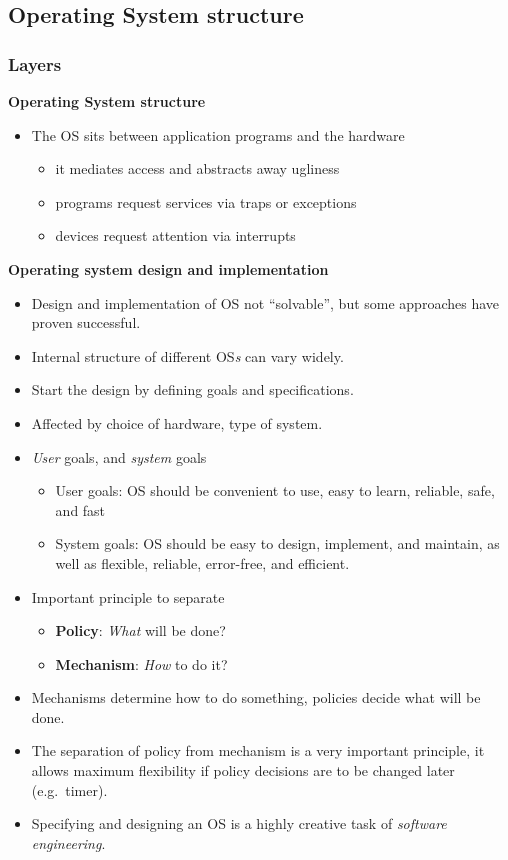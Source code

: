 \documentclass[11pt,a4paper]{article}
\begin{document}
\subsection{Operating System structure}

\subsubsection{Layers}

\textbf{Operating System structure}
\begin{itemize}
    \item The OS sits between application programs and the hardware
        \begin{itemize}
            \item it mediates access and abstracts away ugliness
            \item programs request services via traps or exceptions
            \item devices request attention via interrupts
        \end{itemize}
\end{itemize}

\textbf{Operating system design and implementation}
\begin{itemize}
    \item Design and implementation of OS not ``solvable'', but some approaches have proven
        successful.
    \item Internal structure of different OS\emph{s} can vary widely.
    \item Start the design by defining goals and specifications.
    \item Affected by choice of hardware, type of system.
    \item \emph{User} goals, and \emph{system} goals
        \begin{itemize}
            \item User goals: OS should be convenient to use, easy to learn, reliable, safe,
                and fast
            \item System goals: OS should be easy to design, implement, and maintain,
                as well as flexible, reliable, error-free, and efficient.
        \end{itemize}
    \item Important principle to separate
        \begin{itemize}
            \item \textbf{Policy}: \emph{What} will be done?
            \item \textbf{Mechanism}: \emph{How} to do it?
        \end{itemize}
    \item Mechanisms determine how to do something, policies decide what will be done.
    \item The separation of policy from mechanism is a very important principle,
        it allows maximum flexibility if policy decisions are to be changed later
        (e.g.\ timer).
    \item Specifying and designing an OS is a highly creative task of
        \emph{software engineering}.
\end{itemize}
\end{document}
